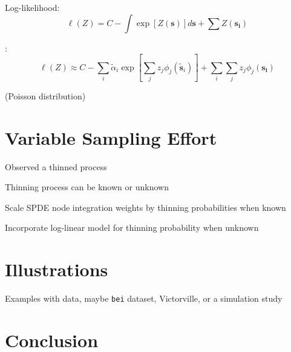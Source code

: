\documentclass[]{interact}
\begin{document}
Log-likelihood:
$$\ell(Z) = C - \int \exp\left[Z(\mathbf{s})\right] d\mathbf{s} + \sum Z(\mathbf{s_{i}})$$

\cite{simpsonetal}:
$$\ell(Z) \approx C - \sum_{i} \tilde{\alpha}_{i} \exp\left[\sum_{j} z_{j}\phi_{j}(\tilde{\mathbf{s}}_{i})\right] + \sum_{i} \sum_{j} z_{j}\phi_{j}(\mathbf{s_{i}})$$

(Poisson distribution)


\section{Variable Sampling Effort}

Observed a thinned process

Thinning process can be known or unknown

Scale SPDE node integration weights by thinning probabilities when known

Incorporate log-linear model for thinning probability when unknown \cite{yuanetal}


\section{Illustrations}

Examples with data, maybe \texttt{bei} dataset, Victorville, or a simulation study


\section{Conclusion}





\end{document}
